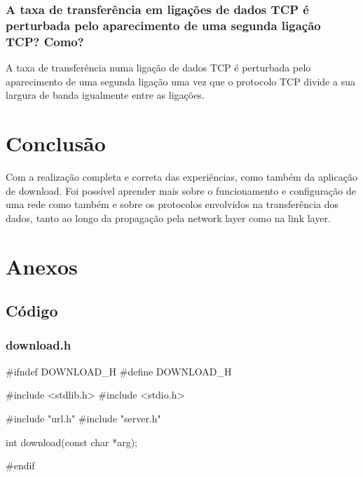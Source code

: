 \documentclass[11pt,a4paper,twocolumn]{article}
\begin{document}
\subsubsection{A taxa de transferência em ligações de dados TCP é perturbada pelo aparecimento de uma segunda ligação TCP? Como?}

A taxa de transferência numa ligação de dados TCP é perturbada pelo aparecimento de uma segunda ligação uma vez que o protocolo TCP divide a sua largura de banda igualmente entre as ligações. 

\section{Conclusão}

Com a realização completa e correta das experiências, como também da aplicação de download. Foi possível aprender mais sobre o funcionamento e configuração de uma rede como também e sobre os protocolos envolvidos na transferência dos dados, tanto ao longo da propagação pela network layer como na link layer.

\section{Anexos}


\subsection{Código}

\subsubsection{download.h}
\begin{c-darktheme}
    #ifndef DOWNLOAD_H
    #define DOWNLOAD_H

    #include <stdlib.h>
    #include <stdio.h>

    #include "url.h"
    #include "server.h"

    int download(const char *arg);

    #endif
\end{c-darktheme}
\end{document}
